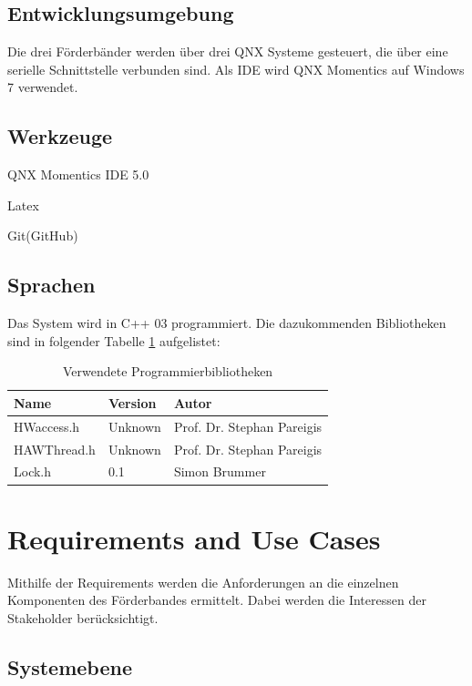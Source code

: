 \documentclass[a4paper, 11pt]{article}
\begin{document}
\subsection{Entwicklungsumgebung}
Die drei Förderbänder werden über drei QNX Systeme gesteuert, die über eine serielle Schnittstelle verbunden sind. Als IDE wird QNX Momentics auf Windows 7 verwendet.

\subsection{Werkzeuge}
\begin{compactenum}[-]
\item QNX Momentics IDE 5.0
\item Latex
\item Git(GitHub)
\end{compactenum}

\subsection{Sprachen}
Das System wird in C++ 03 programmiert. Die dazukommenden Bibliotheken sind in folgender Tabelle \ref{bibl} aufgelistet:
\medskip
\begin{table}[h]
\center
\begin{tabular}{|l|l|l|}
\hline
\textbf{Name}&\textbf{Version}&\textbf{Autor}\\
\hline
HWaccess.h&Unknown&Prof. Dr. Stephan Pareigis\\
\hline
HAWThread.h&Unknown&Prof. Dr. Stephan Pareigis \\
\hline
Lock.h&0.1&Simon Brummer \\
\hline
\end{tabular}
\caption{Verwendete Programmierbibliotheken}
\label{bibl}
\end{table}

\newpage

\section{Requirements and Use Cases}
Mithilfe der Requirements werden die Anforderungen an die einzelnen Komponenten des Förderbandes ermittelt. Dabei werden die Interessen der Stakeholder berücksichtigt.
\subsection{Systemebene}
\end{document}
